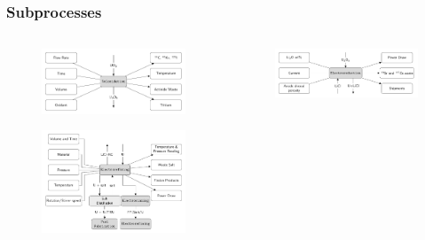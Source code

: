 \begin{frame}
\frametitle{Subprocesses}
\begin{columns}
	\begin{column}{.5\textwidth}
		\begin{figure} 
			\centering
			\includegraphics[width=0.9\linewidth]{volox}
			\label{fig:volox}
		\end{figure}
		\begin{figure} 
			\centering
			\includegraphics[width=0.9\linewidth]{refining}
			\label{fig:refining}
		\end{figure}
	\end{column}
	\begin{column}{.5\textwidth}
		\begin{figure}
			\centering
			\includegraphics[width=0.9\linewidth]{reduction}

\end{figure}
\end{column}
\end{columns}
\end{frame}
